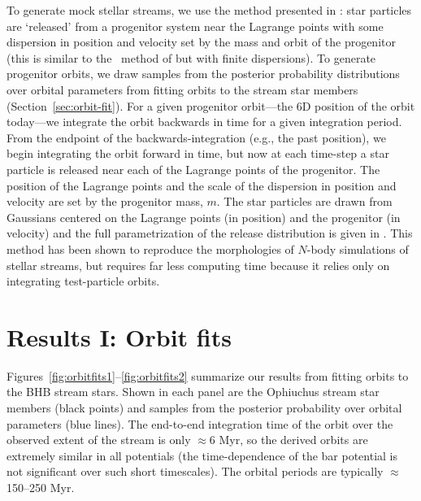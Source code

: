 \documentclass[letterpaper,12pt,preprint]{aastex}
\begin{document}
To generate mock stellar streams, we use the method presented in \citep{fardal14}: star particles are `released' from a progenitor system near the Lagrange points with some dispersion in position and velocity set by the mass and orbit of the progenitor (this is similar to the \streakline\ method of \citet{kuepper12} but with finite dispersions). To generate progenitor orbits, we draw samples from the posterior probability distributions over orbital parameters from fitting orbits to the stream star members (Section~\ref{sec:orbit-fit}). For a given progenitor orbit---the 6D position of the orbit today---we integrate the orbit backwards in time for a given integration period. From the endpoint of the backwards-integration (e.g., the past position), we begin integrating the orbit forward in time, but now at each time-step a star particle is released near each of the Lagrange points of the progenitor. The position of the Lagrange points and the scale of the dispersion in position and velocity are set by the progenitor mass, $m$. The star particles are drawn from Gaussians centered on the Lagrange points (in position) and the progenitor (in velocity) and the full parametrization of the release distribution is given in \cite{fardal14}. This method has been shown to reproduce the morphologies of $N$-body simulations of stellar streams, but requires far less computing time because it relies only on integrating test-particle orbits.

\section{Results I: Orbit fits}\label{sec:results1}

Figures~\ref{fig:orbitfits1}--\ref{fig:orbitfits2} summarize our results from fitting orbits to the BHB stream stars. Shown in each panel are the Ophiuchus stream star members (black points) and samples from the  posterior probability over orbital parameters (blue lines). The end-to-end integration time of the orbit over the observed extent of the stream is only $\approx$6 Myr, so the derived orbits are extremely similar in all potentials (the time-dependence of the bar potential is not significant over such short timescales). The orbital periods are typically $\approx$150--250 Myr.
\end{document}
